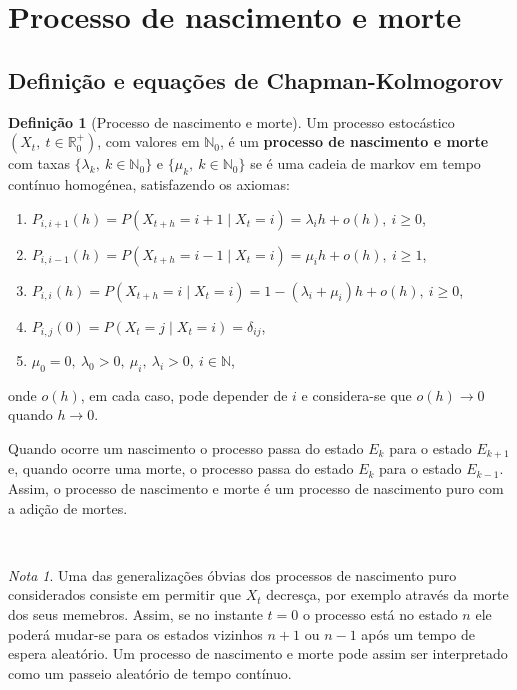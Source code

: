 \documentclass[
  11pt,
  a4paper,
]{book}
\theoremstyle{definition}
\newtheorem{definition}{Definição}[chapter]
\theoremstyle{definition}
\theoremstyle{definition}
\theoremstyle{definition}
\theoremstyle{remark}
\newtheorem*{remark}{Nota }
\begin{document}
\section{Processo de nascimento e morte}\label{processo-de-nascimento-e-morte}

\subsection{Definição e equações de Chapman-Kolmogorov}\label{definicao-e-equacoes-de-chapman-kolmogorov}

\begin{definition}[Processo de nascimento e morte]
Um processo estocástico \((X_t, ~ t \in \mathbb{R}_0^+)\), com valores em \(\mathbb{N}_0\), é um \textbf{processo de nascimento e morte} com taxas \(\{\lambda_k, ~k \in \mathbb{N}_0\}\) e \(\{\mu_k, ~k \in \mathbb{N}_0\}\) se é uma cadeia de markov em tempo contínuo homogénea, satisfazendo os axiomas:

\begin{enumerate}
\def\labelenumi{\arabic{enumi}.}
\item
  \(P_{i,i+1}(h)=P(X_{t+h}=i+1 \mid X_{t}=i)=\lambda_i h + o(h), ~i \geq 0\),
\item
  \(P_{i,i-1}(h)=P(X_{t+h}=i-1 \mid X_{t}=i)=\mu_i h + o(h), ~i \geq 1\),
\item
  \(P_{i,i}(h)=P(X_{t+h}=i \mid X_{t}=i)=1-(\lambda_i+\mu_i) h + o(h), ~ i \geq 0\),
\item
  \(P_{i,j}(0)=P(X_{t}=j \mid X_{t}=i)=\delta_{ij}\),
\item
  \(\mu_0=0, ~\lambda_0 >0, ~\mu_i, ~\lambda_i>0, ~i \in \mathbb{N}\),
\end{enumerate}

onde \(o(h)\), em cada caso, pode depender de \(i\) e considera-se que \(o(h) \to 0\) quando \(h \to 0\).

Quando ocorre um nascimento o processo passa do estado \(E_k\) para o estado \(E_{k+1}\) e, quando ocorre uma morte, o processo passa do estado \(E_k\) para o estado \(E_{k-1}\). Assim, o processo de nascimento e morte é um processo de nascimento puro com a adição de mortes.
\end{definition}

\(\,\)

\begin{remark}
Uma das generalizações óbvias dos processos de nascimento puro considerados consiste em permitir que \(X_t\) decresça, por exemplo através da morte dos seus memebros. Assim, se no instante \(t=0\) o processo está no estado \(n\) ele poderá mudar-se para os estados vizinhos \(n+1\) ou \(n-1\) após um tempo de espera aleatório. Um processo de nascimento e morte pode assim ser interpretado como um passeio aleatório de tempo contínuo.
\end{remark}
\end{document}
